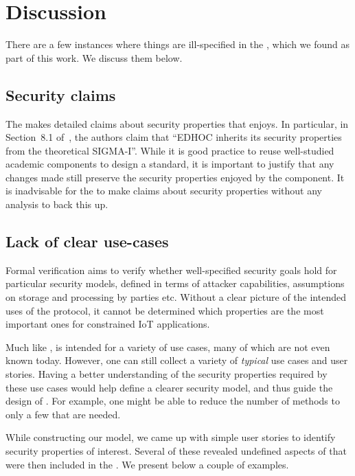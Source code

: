 \documentclass[runningheads, envcountsame, a4paper, draft, x11names]{llncs}
\newcommand{\spacehack}{\vspace{-1em}}
\newcommand{\fillhack}{\vspace{-0.5em}}
\begin{document}
\section{Discussion}
\label{sec:discussion}
\fillhack
There are a few instances where things are ill-specified in the \mSpec{}, which we found as part of this work. We discuss them below. 

\spacehack
\subsection{Security claims}
\label{sec:securityClaims}
\fillhack
The \mSpec{} makes detailed claims about security properties that \mEdhoc{} enjoys. In particular, in Section~8.1 of~\cite{selander-lake-edhoc-01}, the authors claim that ``EDHOC inherits its security properties from the theoretical SIGMA-I''. While it is good practice to reuse well-studied academic components to design a standard, it is important to justify that any changes made still preserve the security properties enjoyed by the component. It is inadvisable for the \mSpec{} to make claims about security properties without any analysis to back this up.   

\spacehack
\subsection{Lack of clear use-cases}
\label{sec:unclearProtocolUse}
\fillhack
Formal verification aims to verify whether well-specified security goals hold for particular security models, defined in terms of attacker capabilities, assumptions on storage and processing by parties etc. Without a clear picture of the intended uses of the protocol, it cannot be determined which properties are the most important ones for constrained IoT applications.

Much like \mDandTls{}, \mEdhoc{} is intended for a variety of use cases,
many of which are not even known today. However, one can still collect a variety of \emph{typical} use cases and user stories. Having a better understanding of the security properties required by these use cases would help define a clearer security model, and thus guide the design of \mEdhoc{}. For example, one might be able to reduce the number of methods to only a few that are needed.

While constructing our model, we came up with simple user stories to identify security properties of interest. Several of these revealed undefined aspects of \mEdhoc{} that were then included in the \mSpec. We present below a couple of examples.
\end{document}
